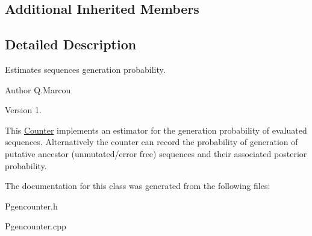 \subsection*{Additional Inherited Members}


\subsection{Detailed Description}
Estimates sequences generation probability. 

\begin{DoxyAuthor}{Author}
Q.\+Marcou 
\end{DoxyAuthor}
\begin{DoxyVersion}{Version}
1.
\end{DoxyVersion}
This \hyperlink{classCounter}{Counter} implements an estimator for the generation probability of evaluated sequences. Alternatively the counter can record the probability of generation of putative ancestor (unmutated/error free) sequences and their associated posterior probability. 

The documentation for this class was generated from the following files\+:\begin{DoxyCompactItemize}
\item 
Pgencounter.\+h\item 
Pgencounter.\+cpp\end{DoxyCompactItemize}
